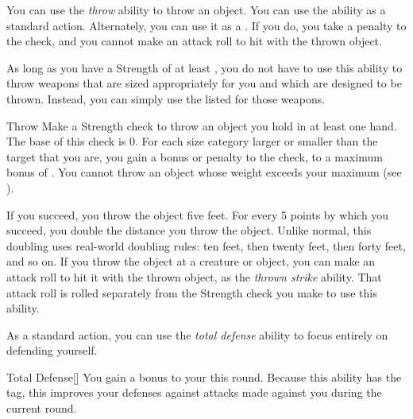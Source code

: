         \label{Throw} You can use the \textit{throw} ability to throw an object.
        You can use the ability as a standard action.
        Alternately, you can use it as a .
        If you do, you take a  penalty to the check, and you cannot make an attack roll to hit with the thrown object.

        As long as you have a Strength of at least , you do not have to use this ability to throw weapons that are sized appropriately for you and which are designed to be thrown.
        Instead, you can simply use the listed  for those weapons.

        \begin{activeability}{Throw}
            \rankline
            Make a Strength check to throw an object you hold in at least one hand.
            The base  of this check is 0.
            For each size category larger or smaller than the target that you are, you gain a  bonus or penalty to the check, to a maximum bonus of .
            You cannot throw an object whose weight exceeds your maximum  (see ).

            If you succeed, you throw the object five feet.
            For every 5 points by which you succeed, you double the distance you throw the object.
            Unlike normal, this doubling uses real-world doubling rules: ten feet, then twenty feet, then forty feet, and so on.
            If you throw the object at a creature or object, you can make an attack roll to hit it with the thrown object, as the \textit{thrown strike} ability.
            That attack roll is rolled separately from the Strength check you make to use this ability.
        \end{activeability}

        \label{Total Defense} As a standard action, you can use the \textit{total defense} ability to focus entirely on defending yourself.

        \begin{activeability}{Total Defense}[]
            \rankline
            You gain a  bonus to your  this round.
            Because this ability has the  tag, this improves your defenses against attacks made against you during the current round.
        \end{activeability}

